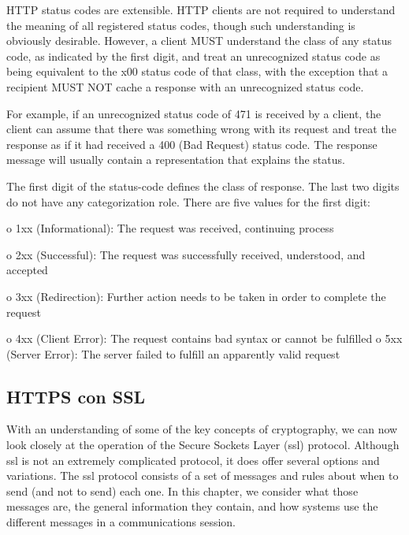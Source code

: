    HTTP status codes are extensible.  HTTP clients are not required to
   understand the meaning of all registered status codes, though such
   understanding is obviously desirable.  However, a client MUST
   understand the class of any status code, as indicated by the first
   digit, and treat an unrecognized status code as being equivalent to
   the x00 status code of that class, with the exception that a
   recipient MUST NOT cache a response with an unrecognized status code.

   For example, if an unrecognized status code of 471 is received by a
   client, the client can assume that there was something wrong with its
   request and treat the response as if it had received a 400 (Bad
   Request) status code.  The response message will usually contain a
   representation that explains the status.

   The first digit of the status-code defines the class of response.
   The last two digits do not have any categorization role.  There are
   five values for the first digit:

   o  1xx (Informational): The request was received, continuing process

   o  2xx (Successful): The request was successfully received,
      understood, and accepted

   o  3xx (Redirection): Further action needs to be taken in order to
      complete the request

   o  4xx (Client Error): The request contains bad syntax or cannot be
      fulfilled
      o  5xx (Server Error): The server failed to fulfill an apparently
      valid request
  

\subsection{HTTPS con SSL} 

With an understanding of some of the key concepts of cryptography,
we can now look closely at the operation of the Secure Sockets Layer
(ssl) protocol. Although ssl is not an extremely complicated protocol, 
it does offer several options and variations. 
The ssl protocol consists of a set of messages and rules about when
to send (and not to send) each one. In this chapter, we consider what
those messages are, the general information they contain, and how
systems use the different messages in a communications session. 

